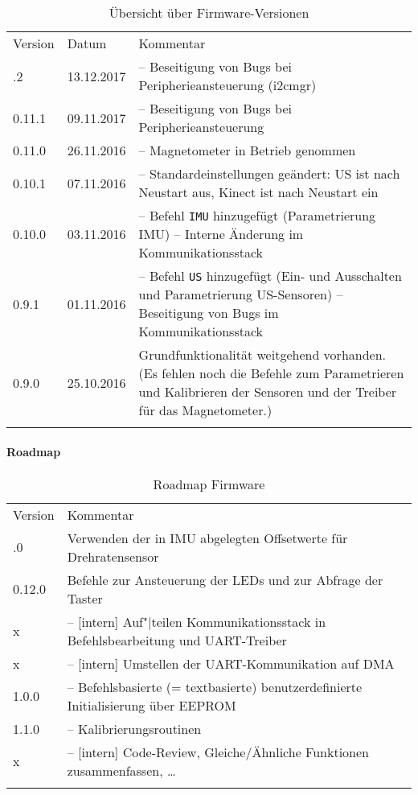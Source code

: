 \begin{table}[htbp]%
	\centering
	\caption{Übersicht über Firmware-Versionen}
	\label{tab:repo:fw_versions}
	\begin{tabular}{llp{10cm}}
		\mytoprule
		Version & Datum & Kommentar \\
		\mymidrule
		0.11.2
			& 13.12.2017
			& -- Beseitigung von Bugs bei Peripherieansteuerung (i2cmgr) \\
		0.11.1
			& 09.11.2017
			& -- Beseitigung von Bugs bei Peripherieansteuerung \\
		0.11.0
			& 26.11.2016
			& -- Magnetometer in Betrieb genommen \\
		0.10.1
			& 07.11.2016
			& -- Standardeinstellungen geändert: US ist nach Neustart aus, Kinect ist nach Neustart ein \\
		0.10.0
			& 03.11.2016
			& -- Befehl \verb|IMU| hinzugefügt (Parametrierung IMU) \newline
				-- Interne Änderung im Kommunikationsstack \\
		0.9.1
			& 01.11.2016
			& -- Befehl \verb|US| hinzugefügt (Ein- und Ausschalten und Parametrierung US-Sensoren) \newline
				-- Beseitigung von Bugs im Kommunikationsstack \\
		0.9.0
			& 25.10.2016
			& Grundfunktionalität weitgehend vorhanden. (Es fehlen noch die Befehle zum Parametrieren und Kalibrieren der Sensoren und der Treiber für das Magnetometer.) \\
		\mybottomrule
	\end{tabular}
\end{table}



\paragraph{Roadmap}


\begin{table}[htbp]%
	\centering
	\caption{Roadmap Firmware}
	\label{tab:repo:fw_roadmap}
	\begin{tabular}{lp{10cm}}
		\mytoprule
		Version & Kommentar \\
		\mymidrule
		0.12.0
			& Verwenden der in IMU abgelegten Offsetwerte für Drehratensensor \\
		0.12.0
			& Befehle zur Ansteuerung der LEDs und zur Abfrage der Taster \\
		x
			& -- [intern] Auf"|teilen Kommunikationsstack in Befehlsbearbeitung und UART-Treiber \\
		x
			& -- [intern] Umstellen der UART-Kommunikation auf DMA \\
		1.0.0
			& -- Befehlsbasierte (= textbasierte) benutzerdefinierte Initialisierung über EEPROM \\
		1.1.0
			& -- Kalibrierungsroutinen \\
		x
			& -- [intern] Code-Review, Gleiche/Ähnliche Funktionen zusammenfassen, \ldots \\
		\mybottomrule
	\end{tabular}
\end{table}
